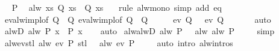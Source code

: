 \begin{isabellebody}
\ \isamarkupfalse%
\ P\ \isamarkupfalse%
\ {\isachardoublequoteopen}alw\ {\isacharparenleft}{\isasymlambda}xs{\isachardot}\ Q{}\ xs\ {\isasymlongrightarrow}\ Q{}\ xs{\isacharparenright}\ {\isasymomega}{\isachardoublequoteclose}\ \isamarkupfalse%
\ {\isacharparenleft}rule\ alw{\isacharunderscore}mono{\isacharparenright}\ {\isacharparenleft}simp\ add{\isacharcolon}\ eq{\isacharparenright}\isanewline
\ \ \isamarkupfalse%
\ \isamarkupfalse%
\ ev{\isacharunderscore}alw{\isacharunderscore}impl{\isacharbrackleft}of\ Q{}\ {\isasymomega}\ Q{}{\isacharbrackright}\ ev{\isacharunderscore}alw{\isacharunderscore}impl{\isacharbrackleft}of\ Q{}\ {\isasymomega}\ Q{}{\isacharbrackright}\isanewline
\ \ \isamarkupfalse%
\ \isamarkupfalse%
\ {\isachardoublequoteopen}ev\ Q{}\ {\isasymomega}\ {\isasymlongleftrightarrow}\ ev\ Q{}\ {\isasymomega}{\isachardoublequoteclose}\isanewline
\ \ \ \ \isamarkupfalse%
\ auto\isanewline
{}\isamarkupfalse%
%
\endisatagproof
{\isafoldproof}%
%
\isadelimproof
\isanewline
%
\endisadelimproof
\isanewline
{}\isamarkupfalse%
\ alwD{\isacharcolon}\ {\isachardoublequoteopen}alw\ P\ x\ {\isasymLongrightarrow}\ P\ x{\isachardoublequoteclose}\isanewline
%
\isadelimproof
\ \ %
\endisadelimproof
%
\isatagproof
{}\isamarkupfalse%
\ auto%
\endisatagproof
{\isafoldproof}%
%
\isadelimproof
\isanewline
%
\endisadelimproof
\isanewline
{}\isamarkupfalse%
\ alw{\isacharunderscore}alwD{\isacharcolon}\ {\isachardoublequoteopen}alw\ P\ {\isasymomega}\ {\isasymLongrightarrow}\ alw\ {\isacharparenleft}alw\ P{\isacharparenright}\ {\isasymomega}{\isachardoublequoteclose}\isanewline
%
\isadelimproof
\ \ %
\endisadelimproof
%
\isatagproof
{}\isamarkupfalse%
\ simp%
\endisatagproof
{\isafoldproof}%
%
\isadelimproof
\isanewline
%
\endisadelimproof
\isanewline
{}\isamarkupfalse%
\ alw{\isacharunderscore}ev{\isacharunderscore}stl{\isacharcolon}\ {\isachardoublequoteopen}alw\ {\isacharparenleft}ev\ P{\isacharparenright}\ {\isacharparenleft}stl\ {\isasymomega}{\isacharparenright}\ {\isasymlongleftrightarrow}\ alw\ {\isacharparenleft}ev\ P{\isacharparenright}\ {\isasymomega}{\isachardoublequoteclose}\isanewline
%
\isadelimproof
\ \ %
\endisadelimproof
%
\isatagproof
{}\isamarkupfalse%
\ {\isacharparenleft}auto\ intro{\isacharcolon}\ alw{\isachardot}intros{\isacharparenright}%

\end{isabellebody}
